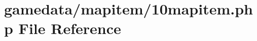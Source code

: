 \hypertarget{10mapitem_8php}{\section{gamedata/mapitem/10mapitem.php File Reference}
\label{10mapitem_8php}
}
